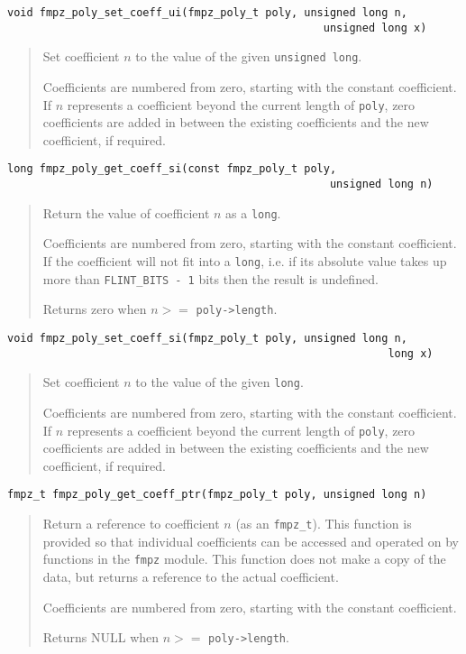 \documentclass[a4paper,10pt]{article}
\newcommand{\code}{\lstinline}
\begin{document}
\begin{lstlisting}
void fmpz_poly_set_coeff_ui(fmpz_poly_t poly, unsigned long n, 
                                                 unsigned long x) 
\end{lstlisting}
\begin{quote}
Set coefficient $n$ to the value of the given \code{unsigned long}. 

Coefficients are numbered from zero, starting with the constant coefficient. If $n$ represents a coefficient beyond the current length of \code{poly}, zero coefficients are added in between the existing coefficients and the new coefficient, if required.
\end{quote}

\begin{lstlisting}
long fmpz_poly_get_coeff_si(const fmpz_poly_t poly, 
                                                  unsigned long n)
\end{lstlisting}
\begin{quote}
Return the value of coefficient $n$ as a \code{long}.

Coefficients are numbered from zero, starting with the constant coefficient. If the coefficient will not fit into a \code{long}, i.e. if its absolute value takes up more than \code{FLINT_BITS - 1} bits then the result is undefined.

Returns zero when $n >= $ \code{poly->length}. 
\end{quote}

\begin{lstlisting}
void fmpz_poly_set_coeff_si(fmpz_poly_t poly, unsigned long n, 
                                                           long x) 
\end{lstlisting}
\begin{quote}
Set coefficient $n$ to the value of the given \code{long}. 

Coefficients are numbered from zero, starting with the constant coefficient. If $n$ represents a coefficient beyond the current length of \code{poly}, zero coefficients are added in between the existing coefficients and the new coefficient, if required.
\end{quote}

\begin{lstlisting}
fmpz_t fmpz_poly_get_coeff_ptr(fmpz_poly_t poly, unsigned long n)
\end{lstlisting}
\begin{quote}
Return a reference to coefficient $n$ (as an \code{fmpz_t}). This function is provided so that individual coefficients can be accessed and operated on by functions in the \code{fmpz} module. This function does not make a copy of the data, but returns a reference to the actual coefficient.

Coefficients are numbered from zero, starting with the constant coefficient. 

Returns NULL when $n >= $ \code{poly->length}. 
\end{quote}
\end{document}

